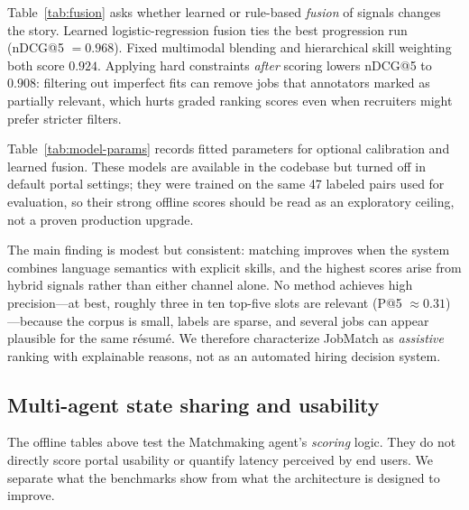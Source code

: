 \begin{JTable}

\end{JTable}

Table~\ref{tab:fusion} asks whether learned or rule-based \emph{fusion} of signals changes the story.
Learned logistic-regression fusion ties the best progression run (nDCG@5 $= 0.968$).
Fixed multimodal blending and hierarchical skill weighting both score $0.924$.
Applying hard constraints \emph{after} scoring lowers nDCG@5 to $0.908$: filtering out imperfect fits can remove jobs that annotators marked as partially relevant, which hurts graded ranking scores even when recruiters might prefer stricter filters.

\begin{JTable}

\end{JTable}

Table~\ref{tab:model-params} records fitted parameters for optional calibration and learned fusion.
These models are available in the codebase but turned off in default portal settings; they were trained on the same 47 labeled pairs used for evaluation, so their strong offline scores should be read as an exploratory ceiling, not a proven production upgrade.

\begin{JTable}

\end{JTable}

The main finding is modest but consistent: matching improves when the system combines language semantics with explicit skills, and the highest scores arise from hybrid signals rather than either channel alone.
No method achieves high precision---at best, roughly three in ten top-five slots are relevant (P@5 $\approx 0.31$)---because the corpus is small, labels are sparse, and several jobs can appear plausible for the same résumé.
We therefore characterize JobMatch as \emph{assistive} ranking with explainable reasons, not as an automated hiring decision system.

\subsection{Multi-agent state sharing and usability}\label{sec:6-agent-sharing}\label{sec:6-agentic}

The offline tables above test the Matchmaking agent's \emph{scoring} logic.
They do not directly score portal usability or quantify latency perceived by end users.
We separate what the benchmarks show from what the architecture is designed to improve.

